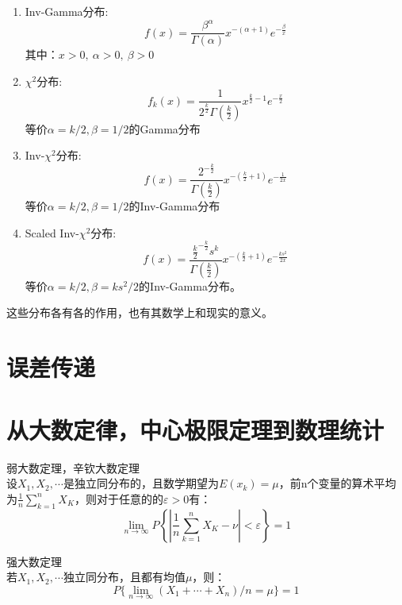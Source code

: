 \begin{enumerate}
\item Inv-Gamma分布: 
\begin{equation}
    f(x)=\frac{\beta^{\alpha}}{\Gamma(\alpha)} x^{-(\alpha+1)} e^{-\frac{\beta}{x}}
\end{equation}
其中：$x>0,\ \alpha>0,\ \beta>0$

\item $\chi ^2$分布: 
\begin{equation}
    f_{k}(x)=\frac{1}{2^{\frac{k}{2}} \Gamma\left(\frac{k}{2}\right)} x^{\frac{k}{2}-1} e^{-\frac{x}{2}}
\end{equation}
等价$\alpha=k/2,\beta = 1/2$的Gamma分布

\item  Inv-$\chi ^2$分布: 
\begin{equation}
    f(x)=\frac{2^{-\frac{k}{2}}}{\Gamma\left(\frac{k}{2}\right)} x^{-\left(\frac{k}{2}+1\right)} e^{-\frac{1}{2 x}}
\end{equation}
等价$\alpha=k/2,\beta = 1/2$的Inv-Gamma分布

\item  Scaled Inv-$\chi ^2$分布: 
   \begin{equation}
       f(x)=\frac{\frac{k}{2}^{-\frac{k}{2}} s^{k}}{\Gamma\left(\frac{k}{2}\right)} x^{-\left(\frac{k}{2}+1\right)} e^{-\frac{k s^{2}}{2 x}}
   \end{equation}
     等价$\alpha=k/2,\beta = ks^2/2$的Inv-Gamma分布。
\end{enumerate}
这些分布各有各的作用，也有其数学上和现实的意义。
\section{误差传递}
\section{从大数定律，中心极限定理到数理统计}
\begin{theorem}{弱大数定理，辛钦大数定理\\}
    设$X_1,X_2,\cdots$是独立同分布的，且数学期望为$E(x_k)=\mu$，前n个变量的算术平均为$\frac{1}{n}\sum_{k=1}^{n}X_K$，则对于任意的的$\varepsilon > 0$有：
    \begin{equation}
        \lim_{n\rightarrow \infty}P \left\{
        \left\lvert \frac{1}{n}\sum_{k=1}^{n}X_K - \nu \right \rvert < \varepsilon
        \right\}=1
    \end{equation}
\end{theorem}

\begin{theorem}{强大数定理\\}
    若$X_1,X_2,\cdots$独立同分布，且都有均值$\mu$，则：
    \begin{equation}
        P\{ \lim_{n\rightarrow \infty}(X_1+\cdots+X_n)/n=\mu \}=1
    \end{equation}
\end{theorem}



